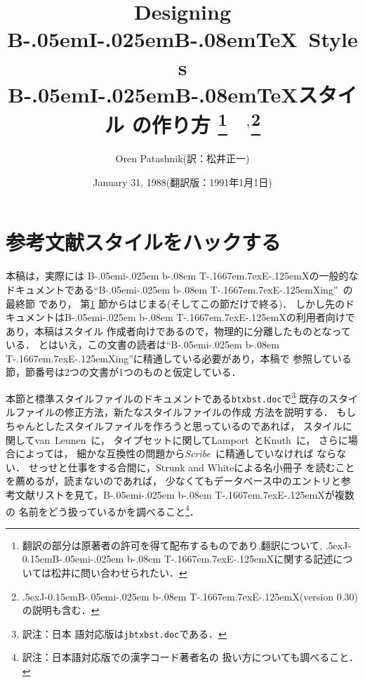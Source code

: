 \def\dg{\gt}
\def\dm{\mc}
\voffset=-2.3cm
\hoffset=-2.3cm
\textwidth=16.6cm
\textheight=25cm

\def\JTeX{\leavevmode\lower .5ex\hbox{J}\kern-.17em\TeX}
\def\JLaTeX{\leavevmode\lower.5ex\hbox{J}\kern-.17em\LaTeX}
\def\BibTeX{{\rm B\kern-.05em{\sc i\kern-.025em b}\kern-.08em
    T\kern-.1667em\lower.7ex\hbox{E}\kern-.125emX}}

\def\JBibTeX{\leavevmode\lower .5ex\hbox{{\rm J}}\kern-0.15em\BibTeX}
\def\trnote#1{\footnote{\parindent=16pt\hskip-15pt\hang\indent 訳注：#1\parindent=10pt}}


\title{Designing B\kern-.05em{\large I}\kern-.025em{\large B}\kern-.08em\TeX\
 Styles\\
B\kern-.05em{\large I}\kern-.025em{\large B}\kern-.08em\TeX スタイル
の作り方
\footnote{翻訳の部分は原著者の許可を得て配布するものであり,翻訳について,
\JBibTeX に関する記述については松井に問い合わせられたい．}
\ $^,$\footnote{\JBibTeX (version 0.30)\cite{jbibtex}の説明も含む．}
}

\author{Oren Patashnik(訳：松井正一)}
\date{January 31, 1988(翻訳版：1991年1月1日)}
\def\orig#1{}

\baselineskip=17pt

\maketitle

\setcounter{section}{4}
\section{参考文献スタイルをハックする}
\label{style}
本稿は，実際には
\BibTeX の一般的なドキュメントである``\BibTeX ing''~\cite{btxdoc}の最終節
であり，
第\ref{style} 節からはじまる(そしてこの節だけで終る)．
しかし先のドキュメントは\BibTeX の利用者向けであり，本稿はスタイル
作成者向けであるので，物理的に分離したものとなっている．
とはいえ，この文書の読者は``\BibTeX ing''に精通している必要があり，本稿で
参照している節，節番号は2つの文書が1つのものと仮定している．

本節と標準スタイルファイルのドキュメントである{\tt btxbst.doc}で\trnote{日本
語対応版は{\tt jbtxbst.doc}である．}
既存のスタイルファイルの修正方法，新たなスタイルファイルの作成
方法を説明する．
もしちゃんとしたスタイルファイルを作ろうと思っているのであれば，
スタイルに関してvan~Leunen~\cite{van-leunen}に，
タイプセットに関してLamport~\cite{latex}とKnuth~\cite{texbook}に，
さらに場合によっては，
細かな互換性の問題から{\em Scribe\/}~\cite{scribe}に精通していなければ
ならない．
せっせと仕事をする合間に，Strunk and Whiteによる名小冊子
\cite{strunk-and-white}を読むことを薦めるが，読まないのであれば，
少なくてもデータベース中のエントリと参考文献リストを見て，\BibTeX が複数の
名前をどう扱っているかを調べること\trnote{日本語対応版での漢字コード著者名の
扱い方についても調べること．}．

